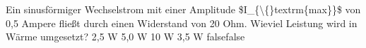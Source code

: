     {Ein sinusförmiger Wechselstrom mit einer Amplitude \$I\_\{\textbackslash\{\}textrm\{max\}\}\$ von 0,5 Ampere fließt durch einen Widerstand von 20 Ohm. Wieviel Leistung wird in Wärme umgesetzt?}
    {2,5 W}
    {5,0 W}
    {10 W}
    {3,5 W}
    {false}{false}